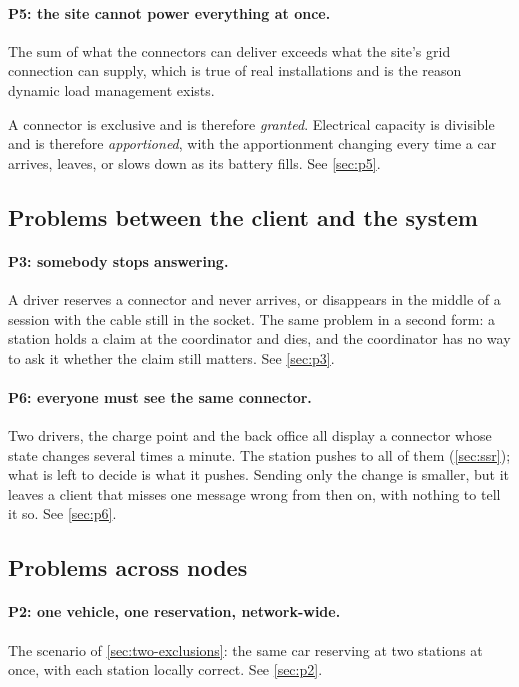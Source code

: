 \paragraph{P5: the site cannot power everything at once.} The sum of what the connectors can
deliver exceeds what the site's grid connection can supply, which is true of real
installations and is the reason dynamic load management exists.

A connector
is exclusive and is therefore \emph{granted}. Electrical capacity is divisible and is
therefore \emph{apportioned}, with the apportionment changing every time a car arrives,
leaves, or slows down as its battery fills. See
\cref{sec:p5}.

\subsection{Problems between the client and the system}
\label{sec:client-problems}

\paragraph{P3: somebody stops answering.} A driver reserves a connector and never arrives,
or disappears in the middle of a session with the cable still in the socket. The same problem in a second form: a station holds a claim at the
coordinator and dies, and the coordinator has no way to ask it whether the claim still
matters. See \cref{sec:p3}.

\paragraph{P6: everyone must see the same connector.} Two drivers, the charge point and the
back office all display a connector whose state changes several times a minute. The station
pushes to all of them (\cref{sec:ssr}); what is left to decide is what it pushes. Sending
only the change is smaller, but it leaves a client that misses one message wrong from then
on, with nothing to tell it so. See \cref{sec:p6}.

\subsection{Problems across nodes}
\label{sec:distributed-problems}

\paragraph{P2: one vehicle, one reservation, network-wide.} The scenario of
\cref{sec:two-exclusions}: the same car reserving at two stations at once, with each station
locally correct. See \cref{sec:p2}.

